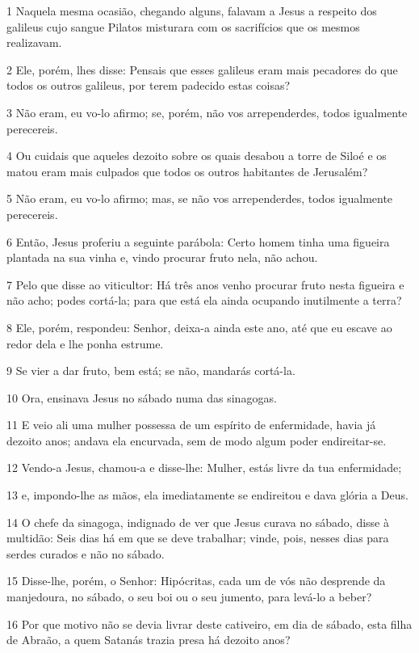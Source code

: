 \par 1 Naquela mesma ocasião, chegando alguns, falavam a Jesus a respeito dos galileus cujo sangue Pilatos misturara com os sacrifícios que os mesmos realizavam.
\par 2 Ele, porém, lhes disse: Pensais que esses galileus eram mais pecadores do que todos os outros galileus, por terem padecido estas coisas?
\par 3 Não eram, eu vo-lo afirmo; se, porém, não vos arrependerdes, todos igualmente perecereis.
\par 4 Ou cuidais que aqueles dezoito sobre os quais desabou a torre de Siloé e os matou eram mais culpados que todos os outros habitantes de Jerusalém?
\par 5 Não eram, eu vo-lo afirmo; mas, se não vos arrependerdes, todos igualmente perecereis.
\par 6 Então, Jesus proferiu a seguinte parábola: Certo homem tinha uma figueira plantada na sua vinha e, vindo procurar fruto nela, não achou.
\par 7 Pelo que disse ao viticultor: Há três anos venho procurar fruto nesta figueira e não acho; podes cortá-la; para que está ela ainda ocupando inutilmente a terra?
\par 8 Ele, porém, respondeu: Senhor, deixa-a ainda este ano, até que eu escave ao redor dela e lhe ponha estrume.
\par 9 Se vier a dar fruto, bem está; se não, mandarás cortá-la.
\par 10 Ora, ensinava Jesus no sábado numa das sinagogas.
\par 11 E veio ali uma mulher possessa de um espírito de enfermidade, havia já dezoito anos; andava ela encurvada, sem de modo algum poder endireitar-se.
\par 12 Vendo-a Jesus, chamou-a e disse-lhe: Mulher, estás livre da tua enfermidade;
\par 13 e, impondo-lhe as mãos, ela imediatamente se endireitou e dava glória a Deus.
\par 14 O chefe da sinagoga, indignado de ver que Jesus curava no sábado, disse à multidão: Seis dias há em que se deve trabalhar; vinde, pois, nesses dias para serdes curados e não no sábado.
\par 15 Disse-lhe, porém, o Senhor: Hipócritas, cada um de vós não desprende da manjedoura, no sábado, o seu boi ou o seu jumento, para levá-lo a beber?
\par 16 Por que motivo não se devia livrar deste cativeiro, em dia de sábado, esta filha de Abraão, a quem Satanás trazia presa há dezoito anos?
